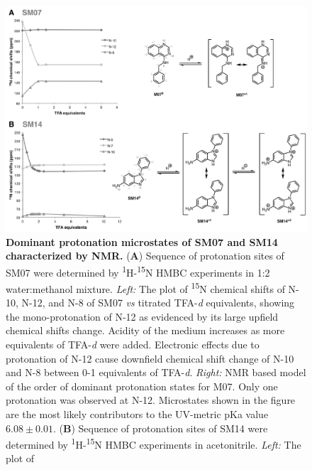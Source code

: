 \documentclass[9pt,lineno]{elife}
\begin{document}
\begin{figure}
\begin{center}
\includegraphics[width=1.00\linewidth]{figures/NMR_microstates_figure.pdf}
\caption{{\bf Dominant protonation microstates of SM07 and SM14 characterized by NMR.}  (\textbf{A}) Sequence of protonation sites of SM07 were determined by \textsuperscript{1}H-\textsuperscript{15}N HMBC experiments in 1:2 water:methanol mixture. \textit{Left:} The plot of 
\textsuperscript{15}N chemical shifts of N-10, N-12, and N-8 of SM07 \textit{vs} titrated TFA-\textit{d} equivalents, showing the mono-protonation of N-12 as evidenced by its large upfield chemical shifts change. Acidity of the medium increases as more equivalents of TFA-\textit{d} were added. Electronic effects due to protonation of N-12 cause downfield chemical shift change of N-10 and N-8 between 0-1 equivalents of TFA-\textit{d}. \textit{Right:} NMR based model of the order of dominant protonation states for M07. Only one protonation was observed at N-12. Microstates shown in the figure are the most likely contributors to the UV-metric pKa value $6.08 \pm 0.01$.
(\textbf{B}) Sequence of protonation sites of SM14 were determined by \textsuperscript{1}H-\textsuperscript{15}N HMBC experiments in acetonitrile. \textit{Left:} The plot of 
}
\end{center}
\end{figure}
\end{document}
